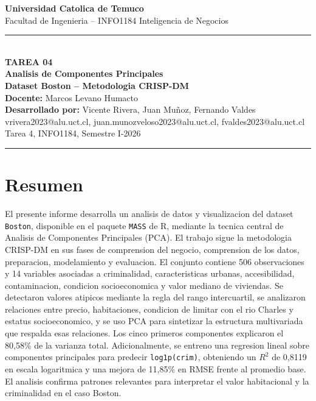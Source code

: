 \documentclass[10pt,a4paper]{article}
\begin{document}
\begin{center}
  {\large \textbf{Universidad Catolica de Temuco}} \\[2pt]
  {\normalsize Facultad de Ingenieria -- INFO1184 Inteligencia de Negocios} \\[8pt]
  \rule{0.86\textwidth}{0.6pt} \\[8pt]
  {\Large \textbf{TAREA 04}} \\[4pt]
  {\LARGE \textbf{Analisis de Componentes Principales}} \\[4pt]
  {\LARGE \textbf{Dataset Boston -- Metodologia CRISP-DM}} \\[10pt]
  {\normalsize \textbf{Docente:} Marcos Levano Humacto} \\[3pt]
  {\normalsize \textbf{Desarrollado por:} Vicente Rivera, Juan Mu\~noz, Fernando Valdes} \\[2pt]
  {\small vrivera2023@alu.uct.cl, juan.munozveloso2023@alu.uct.cl, fvaldes2023@alu.uct.cl} \\[2pt]
  {\small Tarea 4, INFO1184, Semestre I-2026} \\[8pt]
  \rule{0.86\textwidth}{0.6pt}
\end{center}

\section*{Resumen}

El presente informe desarrolla un analisis de datos y visualizacion del dataset \texttt{Boston}, disponible en el paquete \texttt{MASS} de R, mediante la tecnica central de Analisis de Componentes Principales (PCA). El trabajo sigue la metodologia CRISP-DM en sus fases de comprension del negocio, comprension de los datos, preparacion, modelamiento y evaluacion. El conjunto contiene 506 observaciones y 14 variables asociadas a criminalidad, caracteristicas urbanas, accesibilidad, contaminacion, condicion socioeconomica y valor mediano de viviendas. Se detectaron valores atipicos mediante la regla del rango intercuartil, se analizaron relaciones entre precio, habitaciones, condicion de limitar con el rio Charles y estatus socioeconomico, y se uso PCA para sintetizar la estructura multivariada que respalda esas relaciones. Los cinco primeros componentes explicaron el 80,58\% de la varianza total. Adicionalmente, se entreno una regresion lineal sobre componentes principales para predecir \texttt{log1p(crim)}, obteniendo un $R^2$ de 0,8119 en escala logaritmica y una mejora de 11,85\% en RMSE frente al promedio base. El analisis confirma patrones relevantes para interpretar el valor habitacional y la criminalidad en el caso Boston.
\end{document}
